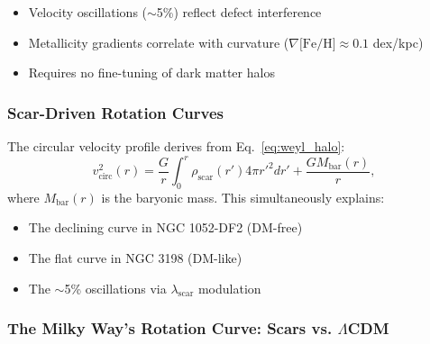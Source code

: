 \documentclass{article}
\begin{document}
\begin{itemize}
  \item Velocity oscillations ($\sim$5\%) reflect defect interference
  \item Metallicity gradients correlate with curvature ($\nabla\text{[Fe/H]} \approx 0.1$ dex/kpc)
  \item Requires no fine-tuning of dark matter halos
\end{itemize}

\subsubsection{Scar-Driven Rotation Curves}
\label{subsubsec:scar_rotation}
The circular velocity profile derives from Eq.~\ref{eq:weyl_halo}:
\begin{equation}
v_{\text{circ}}^2(r) = \frac{G}{r}\int_0^r \rho_{\text{scar}}(r') 4\pi r'^2 dr' + \frac{GM_{\text{bar}}(r)}{r},
\label{eq:vcirc_scars}
\end{equation}
where $M_{\text{bar}}(r)$ is the baryonic mass. This simultaneously explains:
\begin{itemize}
    \item The declining curve in NGC 1052-DF2 (DM-free)
    \item The flat curve in NGC 3198 (DM-like)
    \item The $\sim$5\% oscillations via $\lambda_{\text{scar}}$ modulation
\end{itemize}

\subsubsection{The Milky Way's Rotation Curve: Scars vs. $\Lambda$CDM}
\label{subsubsec:milkyway}
\end{document}
